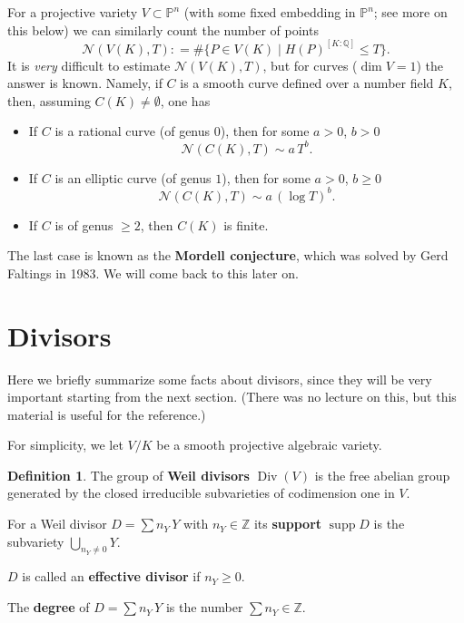 \documentclass{article}
\theoremstyle{definition}
\newtheorem{definition}[proposition]{Definition}
\DeclareMathOperator{\supp}{supp}
\DeclareMathOperator{\Div}{Div}
\newcommand{\term}{\textbf}
\newcommand{\dfn}{\mathrel{\mathop:}=}
\newcommand{\ZZ}{\mathbb{Z}}
\newcommand{\QQ}{\mathbb{Q}}
\newcommand{\PP}{\mathbb{P}}
\begin{document}
For a projective variety $V \subset \PP^n$ (with some fixed embedding in
$\PP^n$; see more on this below) we can similarly count the number of points
$$\mathcal{N} (V(K), T) \dfn \# \{ P \in V (K) \mid H(P)^{[K : \QQ]} \le T \}.$$
It is \emph{very} difficult to estimate $\mathcal{N} (V(K), T)$, but for curves
($\dim V = 1$) the answer is known. Namely, if $C$ is a smooth curve defined
over a number field $K$, then, assuming $C (K) \ne \emptyset$, one has

\begin{itemize}
\item If $C$ is a rational curve (of genus $0$), then for some $a > 0$, $b > 0$
  $$\mathcal{N} (C (K), T) \sim a\,T^b.$$

\item If $C$ is an elliptic curve (of genus $1$), then for some $a > 0$,
  $b \ge 0$
  $$\mathcal{N} (C (K), T) \sim a\,(\log T)^b.$$

\item If $C$ is of genus $\ge 2$, then $C (K)$ is finite.
\end{itemize}

The last case is known as the \term{Mordell conjecture}, which was solved by
Gerd Faltings in 1983. We will come back to this later on.

\section{Divisors}

Here we briefly summarize some facts about divisors, since they will be very
important starting from the next section. (There was no lecture on this, but
this material is useful for the reference.)

For simplicity, we let $V/K$ be a smooth projective algebraic variety.

\begin{definition}
  The group of \term{Weil divisors} $\Div (V)$ is the free abelian group
  generated by the closed irreducible subvarieties of codimension one in $V$.

  For a Weil divisor $D = \sum n_Y\,Y$ with $n_Y \in \ZZ$ its \term{support}
  $\supp D$ is the subvariety $\bigcup_{n_Y\ne 0} Y$.

  $D$ is called an \term{effective divisor} if $n_Y \ge 0$.

  The \term{degree} of $D = \sum n_Y\,Y$ is the number $\sum n_Y \in \ZZ$.
\end{definition}
\end{document}
